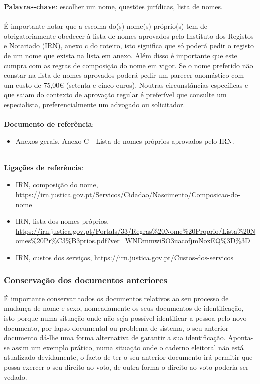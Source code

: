 \textbf{Palavras-chave}: escolher um nome, questões jurídicas, lista de nomes. \\
\\
É importante notar que a escolha do(s) nome(s) próprio(s) tem de
obrigatoriamente obedecer à lista de nomes aprovados pelo Instituto dos
Registos e Notariado (IRN), anexo c do roteiro, isto significa que só
poderá pedir o registo de um nome que exista na lista em anexo. Além
disso é importante que este cumpra com as regras de composição do nome
em vigor. Se o nome preferido não constar na lista de nomes aprovados
poderá pedir um parecer onomástico com um custo de 75,00€ (setenta e
cinco euros). Noutras circunstâncias específicas e que saiam do contexto
de aprovação regular é preferível que consulte um especialista,
preferencialmente um advogado ou solicitador. \\
\\
\textbf{Documento de referência}:
\begin{itemize}
	\item Anexos gerais, Anexo C - Lista de nomes próprios aprovados pelo IRN.
\end{itemize}
\leavevmode\\
\textbf{Ligações de referência}:
\begin{itemize}
	\item IRN, composição do nome, \url{https://irn.justica.gov.pt/Servicos/Cidadao/Nascimento/Composicao-do-nome}
	\item IRN, lista dos nomes próprios, \url{https://irn.justica.gov.pt/Portals/33/Regras\%20Nome\%20Proprio/Lista\%20Nomes\%20Pr\%C3\%B3prios.pdf?ver=WNDmmwiSO3uacofjmNoxEQ\%3D\%3D}
	\item IRN, custos dos serviços, \url{https://irn.justica.gov.pt/Custos-dos-servicos}
\end{itemize}

\subsubsection{Conservação dos documentos anteriores}

É importante conservar todos os documentos relativos ao seu processo de
mudança de nome e sexo, nomeadamente os seus documentos de
identificação, isto porque numa situação onde não seja possível
identificar a pessoa pelo novo documento, por lapso documental ou
problema de sistema, o seu anterior documento dá-lhe uma forma
alternativa de garantir a sua identificação. Aponta-se assim um exemplo
prático, numa situação onde o caderno eleitoral não está atualizado
devidamente, o facto de ter o seu anterior documento irá permitir que
possa exercer o seu direito ao voto, de outra forma o direito ao voto
poderia ser vedado. 

